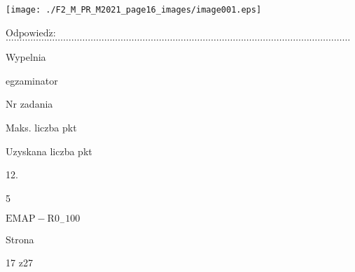 \documentclass[a4paper,12pt]{article}
\begin{document}
\begin{center}
\texttt{[image: ./F2\_M\_PR\_M2021\_page16\_images/image001.eps]}
\end{center}
$\mathrm{O}\mathrm{d}\mathrm{p}\mathrm{o}\mathrm{w}\mathrm{i}\mathrm{e}\mathrm{d}\acute{\mathrm{z}}$:$\ldots\ldots\ldots\ldots\ldots\ldots\ldots\ldots\ldots\ldots\ldots\ldots\ldots\ldots\ldots\ldots\ldots\ldots\ldots\ldots\ldots\ldots\ldots\ldots\ldots\ldots\ldots\ldots\ldots\ldots\ldots\ldots\ldots\ldots\ldots\ldots\ldots\ldots\ldots\ldots\ldots\ldots$

Wypelnia

egzaminator

Nr zadania

Maks. liczba pkt

Uzyskana liczba pkt

12.

5

$\mathrm{E}\mathrm{M}\mathrm{A}\mathrm{P}-\mathrm{R}0_{-}100$

Strona

17 z27
\end{document}
